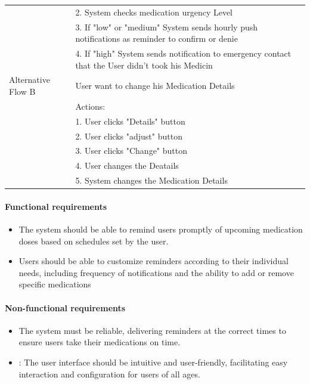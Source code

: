 \documentclass{article}
\begin{document}
\begin{table}[h!]
\begin{tabularx}{\textwidth}{|>{\raggedright\arraybackslash}p{}|X|}
                         & 2. System checks medication urgency Level \\
                         & 3. If "low" or "medium" System sends hourly push notifications as reminder 
                           to confirm or denie \\
                         & 4. If "high" System sends notification to emergency contact that the User didn't took his Medicin \\ \hline
        Alternative Flow B & User want to change his Medication Details \\
                         & Actions: \\
                         & 1. User clicks "Details" button \\
                         & 2. User clicks "adjust" button \\
                         & 3. User clicks "Change" button \\
                         & 4. User changes the Deatails \\
                         & 5. System changes the Medication Details\\ \hline
    \end{tabularx}
\end{table}

\paragraph{Functional requirements}
		\begin{itemize}
			\item  The system should be able to remind users promptly of upcoming medication doses based on schedules set by the user.
			\item  Users should be able to customize reminders according to their individual needs, including frequency of notifications and the ability to add or remove specific medications
		\end{itemize}
		
	\paragraph{Non-functional requirements}
		\begin{itemize}
			\item The system must be reliable, delivering reminders at the correct times to ensure users take their medications on time.
			\item : The user interface should be intuitive and user-friendly, facilitating easy interaction and configuration for users of all ages.
		\end{itemize}
\end{document}
